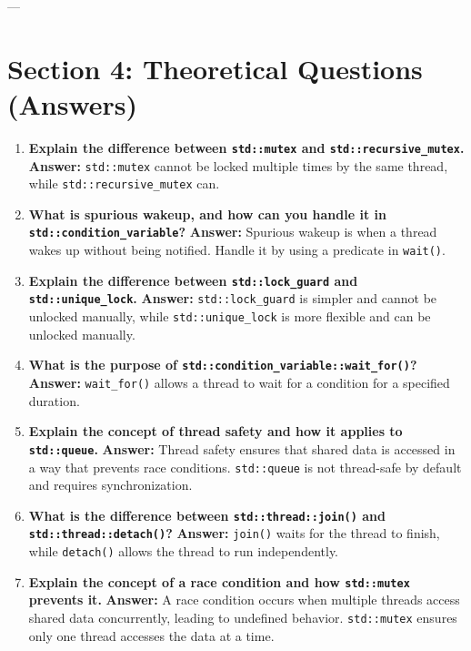 \documentclass[12pt]{article}
\begin{document}
---

\section*{Section 4: Theoretical Questions (Answers)}

\begin{enumerate}
    \item \textbf{Explain the difference between \texttt{std::mutex} and \texttt{std::recursive\_mutex}.}
    \textbf{Answer:} \texttt{std::mutex} cannot be locked multiple times by the same thread, while \texttt{std::recursive\_mutex} can.

    \item \textbf{What is spurious wakeup, and how can you handle it in \texttt{std::condition\_variable}?}
    \textbf{Answer:} Spurious wakeup is when a thread wakes up without being notified. Handle it by using a predicate in \texttt{wait()}.

    \item \textbf{Explain the difference between \texttt{std::lock\_guard} and \texttt{std::unique\_lock}.}
    \textbf{Answer:} \texttt{std::lock\_guard} is simpler and cannot be unlocked manually, while \texttt{std::unique\_lock} is more flexible and can be unlocked manually.

    \item \textbf{What is the purpose of \texttt{std::condition\_variable::wait\_for()}?}
    \textbf{Answer:} \texttt{wait\_for()} allows a thread to wait for a condition for a specified duration.

    \item \textbf{Explain the concept of thread safety and how it applies to \texttt{std::queue}.}
    \textbf{Answer:} Thread safety ensures that shared data is accessed in a way that prevents race conditions. \texttt{std::queue} is not thread-safe by default and requires synchronization.

    \item \textbf{What is the difference between \texttt{std::thread::join()} and \texttt{std::thread::detach()}?}
    \textbf{Answer:} \texttt{join()} waits for the thread to finish, while \texttt{detach()} allows the thread to run independently.

    \item \textbf{Explain the concept of a race condition and how \texttt{std::mutex} prevents it.}
    \textbf{Answer:} A race condition occurs when multiple threads access shared data concurrently, leading to undefined behavior. \texttt{std::mutex} ensures only one thread accesses the data at a time.


\end{enumerate}
\end{document}
